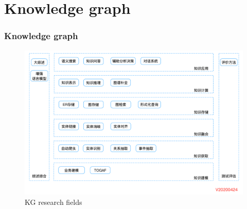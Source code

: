 \documentclass{beamer}
\begin{document}




\section{Knowledge graph}

\begin{frame}%
  \frametitle{Knowledge graph\cite{1}}
  \begin{figure}
    \centering
    \includegraphics[height=0.6\textwidth]{figure/kg0}
    \caption{KG research fields}
  \end{figure}
  

\end{frame}
\end{document}
